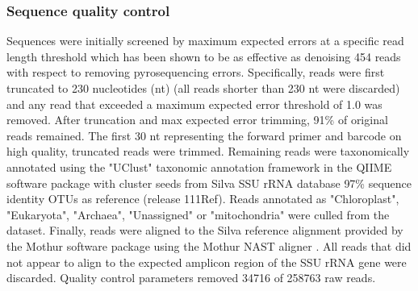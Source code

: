 \subsubsection{Sequence quality control} Sequences were initially screened by
maximum expected errors at a specific read length threshold \citep{23955772}
which has been shown to be as effective as denoising 454 reads with respect to
removing pyrosequencing errors. Specifically, reads were first truncated to 230
nucleotides (nt) (all reads shorter than 230 nt were discarded) and any read that
exceeded a maximum expected error threshold of 1.0 was removed. After
truncation and max
expected error trimming, 91\% of original reads remained. The first 30 nt
representing the forward primer and barcode on high quality, truncated reads
were trimmed. Remaining reads were taxonomically annotated using the "UClust"
taxonomic annotation framework in the QIIME software package \citep{20383131,
20709691} with cluster seeds from Silva SSU rRNA database \citep{17947321} 97\%
sequence identity OTUs as reference (release 111Ref). Reads annotated as
"Chloroplast", "Eukaryota", "Archaea", "Unassigned" or "mitochondria" were
culled from the dataset. Finally, reads were aligned to the Silva reference
alignment provided by the Mothur software package \citep{19801464} using the
Mothur NAST aligner \citep{16845035}. All reads that did not appear to align to
the expected amplicon region of the SSU rRNA gene were discarded. Quality
control parameters removed 34716 of 258763 raw reads.

